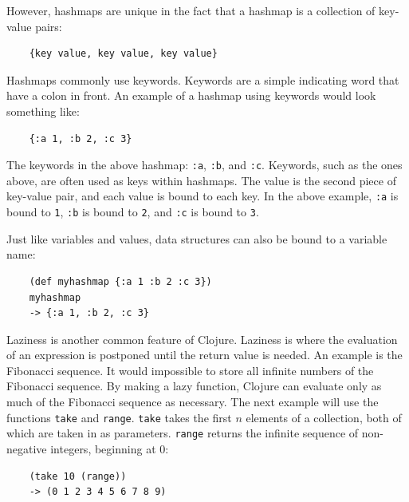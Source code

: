 \documentclass[12pt]{article}
\newcommand{\comment}[1]{{\bf \tt  {#1}}}
\newcommand{\emcomment}[1]{\textcolor{ForestGreen}{\comment{Elena: {#1}}}}
\begin{document}
However, hashmaps are unique in the fact that a hashmap is a collection of key-value pairs: 
\begin{verbatim}
	{key value, key value, key value}
\end{verbatim}

Hashmaps commonly use keywords. Keywords are a simple indicating word that have a colon in front.
An example of a hashmap using keywords would look something like: 
\begin{verbatim}
	{:a 1, :b 2, :c 3}
\end{verbatim}

The keywords in the above hashmap: \texttt{:a}, \texttt{:b}, and \texttt{:c}. Keywords, such as the
ones above, are often used as keys within hashmaps. The value is the second piece of key-value pair,
and each value is bound to each key. In the above example, \texttt{:a} is bound to \texttt{1},
\texttt{:b} is bound to \texttt{2}, and \texttt{:c} is bound to \texttt{3}.

Just like variables and values, data structures can also be bound to a
variable name: 
\begin{verbatim}
	(def myhashmap {:a 1 :b 2 :c 3})
	myhashmap
	-> {:a 1, :b 2, :c 3}
\end{verbatim}

Laziness is another common feature of Clojure. Laziness is where the evaluation of an expression is
postponed until the return value is needed. An example is the Fibonacci sequence. It would impossible
to store all infinite numbers of the Fibonacci sequence. By making a lazy function, Clojure can
evaluate only as much of the Fibonacci sequence as necessary. The next example will use the functions 
\texttt{take} and \texttt{range}. \texttt{take} takes the first $n$ elements of a collection, both of
which are taken in as parameters. \texttt{range} returns the infinite sequence of non-negative
integers, beginning at 0:
\begin{verbatim}
	(take 10 (range))
	-> (0 1 2 3 4 5 6 7 8 9)
\end{verbatim}
\end{document}
